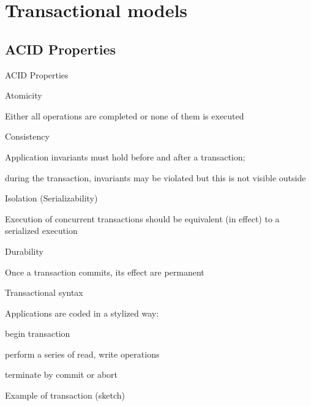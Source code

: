 
\section{Transactional models}
\subsection{ACID Properties}

\begin{frame}{ACID Properties}
	
\BI
\item \alert{Atomicity}
	\BI
	\item Either all operations are completed or none of them is executed
	\EI
\item \alert{Consistency}
	\BI
	\item Application invariants must hold before and after a transaction; 
	\item during the transaction, invariants may be violated but this is not visible outside
	\EI
\item \alert{Isolation} (Serializability)
	  \BI
	  \item Execution of concurrent transactions should be equivalent (in effect) to a serialized execution
	  \EI
\item \alert{Durability}
	\BI
	\item Once a transaction commits, its effect are permanent
	\EI	
\EI
\end{frame}

\begin{frame}{Transactional syntax}
	
\BI
\item Applications are coded in a stylized way:
	\BI
	\item begin transaction
	\item perform a series of read, write operations
	\item terminate by commit or abort
	\EI
\EI

\begin{Procedure}
\caption{Example of transaction (sketch)}
\end{Procedure}

\end{frame}

